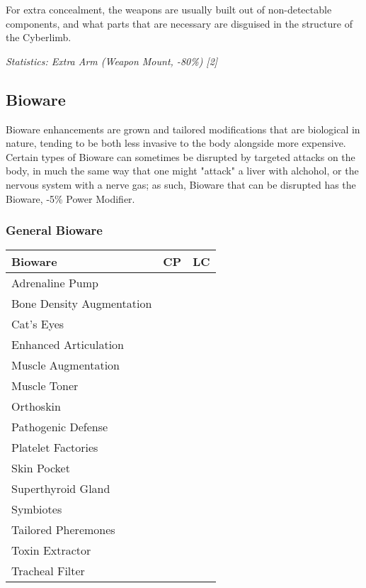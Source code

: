 \begin{multicols*}{3}
	For extra concealment, the weapons are usually built out of non-detectable components, and what parts that are necessary are disguised in the structure of the Cyberlimb. 
	
	\textit{\textcolor{OliveGreen}{Statistics: Extra Arm (Weapon Mount, -80\%) [2]}}
	
	\subsection{Bioware}
	
	Bioware enhancements are grown and tailored modifications that are biological in nature, tending to be both less invasive to the body alongside more expensive. Certain types of Bioware can sometimes be disrupted by targeted attacks on the body, in much the same way that one might "attack" a liver with alchohol, or the nervous system with a nerve gas; as such, Bioware that can be disrupted has the Bioware, -5\% Power Modifier.
	
	\subsubsection{General Bioware}
	
	\begin{center}
		\begin{tabularx}{0.32\textwidth}{|X|c|c|}
			\hline
			Bioware & CP & LC\\
			\hline
			\hline
			Adrenaline Pump & & \\
			Bone Density Augmentation & & \\
			Cat's Eyes & & \\
			Enhanced Articulation & & \\
			Muscle Augmentation & & \\
			Muscle Toner & & \\
			Orthoskin & & \\
			Pathogenic Defense & & \\
			Platelet Factories & & \\
			Skin Pocket & & \\
			Superthyroid Gland & & \\
			Symbiotes & & \\
			Tailored Pheremones & & \\
			Toxin Extractor & & \\
			Tracheal Filter & & \\
			\hline
		\end{tabularx}
	\end{center}
	

\end{multicols*}

